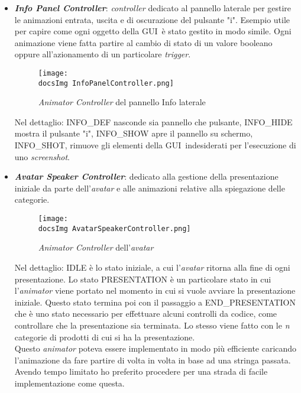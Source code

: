 \begin{itemize}
	\item \textbf{\textit{Info Panel Controller}}: \textit{controller} dedicato al pannello laterale per gestire le animazioni entrata, uscita e di oscurazione del pulsante "i". Esempio utile per capire come ogni oggetto della GUI\gloss\ \`e stato gestito in modo simile. Ogni animazione viene fatta partire al cambio di stato di un valore booleano oppure all'azionamento di un particolare\textit{ trigger}.
	
	\begin{figure}[H]
		\centering
		\texttt{[image: \\docsImg InfoPanelController.png]}
		\caption{\textit{Animator Controller} del pannello Info laterale}
		\label{fig:Animator Controller del pannello Info laterale}
	\end{figure}
	
	Nel dettaglio: INFO\_DEF nasconde sia pannello che pulsante, INFO\_HIDE mostra il pulsante "i", INFO\_SHOW apre il pannello su schermo, INFO\_SHOT, rimuove gli elementi della GUI\gloss\ indesiderati per l'esecuzione di uno \textit{screenshot}.
	
	\item \textbf{\textit{Avatar Speaker Controller}}: dedicato alla gestione della presentazione iniziale da parte dell'\textit{avatar\gloss} e alle animazioni relative alla spiegazione delle categorie.
	
	\begin{figure}[H]
		\centering
		\texttt{[image: \\docsImg AvatarSpeakerController.png]}
		\caption{\textit{Animator Controller} dell'\textit{avatar\gloss}}
		\label{fig:Animator Controller dell'avatar\gloss}
	\end{figure}
	
	Nel dettaglio: IDLE \`e lo stato iniziale, a cui l'\textit{avatar\gloss} ritorna alla fine di ogni presentazione. Lo stato PRESENTATION \`e un particolare stato in cui l'\textit{animator} viene portato nel momento in cui si vuole avviare la presentazione iniziale. Questo stato termina poi con il passaggio a END\_PRESENTATION che \`e uno stato necessario per effettuare alcuni controlli da codice, come controllare che la presentazione sia terminata. Lo stesso viene fatto con le \textit{n} categorie di prodotti di cui si ha la presentazione.\\ Questo \textit{animator} poteva essere implementato in modo pi\`u efficiente caricando l'animazione da fare partire di volta in volta in base ad una stringa passata. Avendo tempo limitato ho preferito procedere per una strada di facile implementazione come questa.
\end{itemize}






